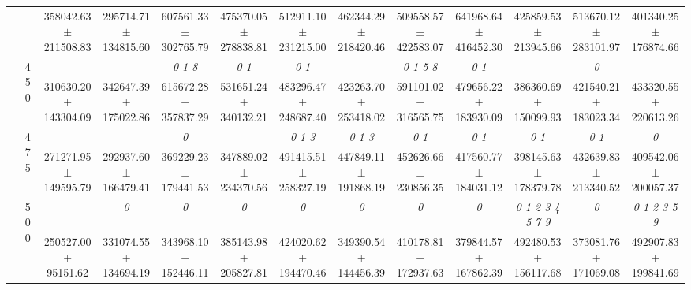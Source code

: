 \begin{table}[h]
{\begin{tabular}{
        ccccccccccccc}
 & & \cellcolor[HTML]{EFEFEF} 358042.63 $\pm$ 211508.83& \cellcolor[HTML]{EFEFEF} 295714.71 $\pm$ 134815.60& \cellcolor[HTML]{EFEFEF} 607561.33 $\pm$ 302765.79& \cellcolor[HTML]{EFEFEF} 475370.05 $\pm$ 278838.81& \cellcolor[HTML]{EFEFEF} 512911.10 $\pm$ 231215.00& \cellcolor[HTML]{EFEFEF} 462344.29 $\pm$ 218420.46& \cellcolor[HTML]{EFEFEF} 509558.57 $\pm$ 422583.07& \cellcolor[HTML]{EFEFEF} 641968.64 $\pm$ 416452.30& \cellcolor[HTML]{EFEFEF} 425859.53 $\pm$ 213945.66& \cellcolor[HTML]{EFEFEF} 513670.12 $\pm$ 283101.97& \cellcolor[HTML]{EFEFEF} 401340.25 $\pm$ 176874.66 \\ 
 & \multirow{2}{*}{450}& & & \textit{ 0 1 8 }& \textit{ 0 1 }& \textit{ 0 1 }& & \textit{ 0 1 5 8 }& \textit{ 0 1 }& & \textit{ 0 }&  \\ 
 & & 310630.20 $\pm$ 143304.09& 342647.39 $\pm$ 175022.86& 615672.28 $\pm$ 357837.29& 531651.24 $\pm$ 340132.21& 483296.47 $\pm$ 248687.40& 423263.70 $\pm$ 253418.02& 591101.02 $\pm$ 316565.75& 479656.22 $\pm$ 183930.09& 386360.69 $\pm$ 150099.93& 421540.21 $\pm$ 183023.34& 433320.55 $\pm$ 220613.26 \\ 
 & \multirow{2}{*}{475}& \cellcolor[HTML]{EFEFEF} & \cellcolor[HTML]{EFEFEF} & \cellcolor[HTML]{EFEFEF} \textit{ 0 }& \cellcolor[HTML]{EFEFEF} & \cellcolor[HTML]{EFEFEF} \textit{ 0 1 3 }& \cellcolor[HTML]{EFEFEF} \textit{ 0 1 3 }& \cellcolor[HTML]{EFEFEF} \textit{ 0 1 }& \cellcolor[HTML]{EFEFEF} \textit{ 0 1 }& \cellcolor[HTML]{EFEFEF} \textit{ 0 1 }& \cellcolor[HTML]{EFEFEF} \textit{ 0 1 }& \cellcolor[HTML]{EFEFEF} \textit{ 0 } \\ 
 & & \cellcolor[HTML]{EFEFEF} 271271.95 $\pm$ 149595.79& \cellcolor[HTML]{EFEFEF} 292937.60 $\pm$ 166479.41& \cellcolor[HTML]{EFEFEF} 369229.23 $\pm$ 179441.53& \cellcolor[HTML]{EFEFEF} 347889.02 $\pm$ 234370.56& \cellcolor[HTML]{EFEFEF} 491415.51 $\pm$ 258327.19& \cellcolor[HTML]{EFEFEF} 447849.11 $\pm$ 191868.19& \cellcolor[HTML]{EFEFEF} 452626.66 $\pm$ 230856.35& \cellcolor[HTML]{EFEFEF} 417560.77 $\pm$ 184031.12& \cellcolor[HTML]{EFEFEF} 398145.63 $\pm$ 178379.78& \cellcolor[HTML]{EFEFEF} 432639.83 $\pm$ 213340.52& \cellcolor[HTML]{EFEFEF} 409542.06 $\pm$ 200057.37 \\ 
 & \multirow{2}{*}{500}& & \textit{ 0 }& \textit{ 0 }& \textit{ 0 }& \textit{ 0 }& \textit{ 0 }& \textit{ 0 }& \textit{ 0 }& \textit{ 0 1 2 3 4 5 7 9 }& \textit{ 0 }& \textit{ 0 1 2 3 5 9 } \\ 
 & & 250527.00 $\pm$ 95151.62& 331074.55 $\pm$ 134694.19& 343968.10 $\pm$ 152446.11& 385143.98 $\pm$ 205827.81& 424020.62 $\pm$ 194470.46& 349390.54 $\pm$ 144456.39& 410178.81 $\pm$ 172937.63& 379844.57 $\pm$ 167862.39& 492480.53 $\pm$ 156117.68& 373081.76 $\pm$ 171069.08& 492907.83 $\pm$ 199841.69 \\ 

\end{tabular}}
\end{table}
